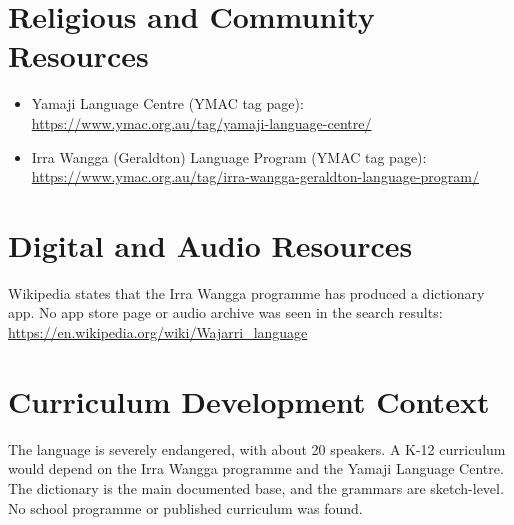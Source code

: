 \documentclass[12pt]{article}
\begin{document}
\section{Religious and Community Resources}
\begin{itemize}
\item Yamaji Language Centre (YMAC tag page): \url{https://www.ymac.org.au/tag/yamaji-language-centre/}
\item Irra Wangga (Geraldton) Language Program (YMAC tag page): \url{https://www.ymac.org.au/tag/irra-wangga-geraldton-language-program/}
\end{itemize}

\section{Digital and Audio Resources}
Wikipedia states that the Irra Wangga programme has produced a dictionary app. No app store page or audio archive was seen in the search results: \url{https://en.wikipedia.org/wiki/Wajarri_language}

\section{Curriculum Development Context}
The language is severely endangered, with about 20 speakers. A K-12 curriculum would depend on the Irra Wangga programme and the Yamaji Language Centre. The dictionary is the main documented base, and the grammars are sketch-level. No school programme or published curriculum was found.
\end{document}
